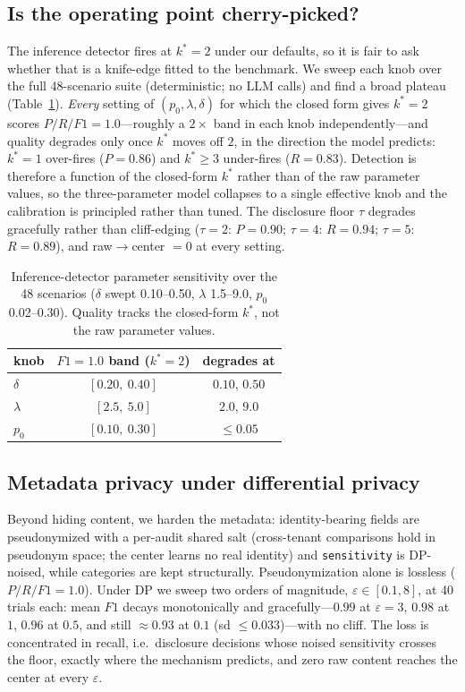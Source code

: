 \documentclass[sigconf,anonymous,review]{acmart}
\theoremstyle{acmplain}
\begin{document}
\subsection{Is the operating point cherry-picked?}
The inference detector fires at $k^{*}{=}2$ under our defaults, so it is fair to ask
whether that is a knife-edge fitted to the benchmark. We sweep each knob over the full
48-scenario suite (deterministic; no LLM calls) and find a broad plateau
(Table~\ref{tab:sens}). \emph{Every} setting of $(p_0,\lambda,\delta)$ for which the
closed form gives $k^{*}{=}2$ scores $P/R/F1=1.0$---roughly a $2\times$ band in each
knob independently---and quality degrades only once $k^{*}$ moves off $2$, in the
direction the model predicts: $k^{*}{=}1$ over-fires ($P{=}0.86$) and $k^{*}\ge3$
under-fires ($R{=}0.83$). Detection is therefore a function of the closed-form
$k^{*}$ rather than of the raw parameter values, so the three-parameter model
collapses to a single effective knob and the calibration is principled rather than
tuned. The disclosure floor $\tau$ degrades gracefully rather than cliff-edging
($\tau{=}2$: $P{=}0.90$; $\tau{=}4$: $R{=}0.94$; $\tau{=}5$: $R{=}0.89$), and
raw$\to$center $=0$ at every setting.

\begin{table}[t]\centering\small
\begin{tabular}{lcc}
\toprule
knob & $F1{=}1.0$ band ($k^{*}{=}2$) & degrades at \\
\midrule
$\delta$  & $[0.20,\ 0.40]$ & $0.10$, $0.50$ \\
$\lambda$ & $[2.5,\ 5.0]$   & $2.0$, $9.0$ \\
$p_0$     & $[0.10,\ 0.30]$ & $\le 0.05$ \\
\bottomrule
\end{tabular}
\caption{Inference-detector parameter sensitivity over the 48 scenarios
($\delta$ swept 0.10--0.50, $\lambda$ 1.5--9.0, $p_0$ 0.02--0.30). Quality tracks the
closed-form $k^{*}$, not the raw parameter values.}
\label{tab:sens}
\end{table}


\subsection{Metadata privacy under differential privacy}
Beyond hiding content, we harden the
metadata: identity-bearing fields are pseudonymized with a per-audit shared salt
(cross-tenant comparisons hold in pseudonym space; the center learns no real
identity) and \texttt{sensitivity} is DP-noised, while categories are kept
structurally. Pseudonymization alone is lossless ($P/R/F1=1.0$). Under DP we
sweep two orders of magnitude, $\varepsilon\in[0.1,8]$, at 40 trials each: mean
$F1$ decays monotonically and gracefully---$0.99$ at $\varepsilon{=}3$, $0.98$ at
$1$, $0.96$ at $0.5$, and still $\approx0.93$ at $0.1$ (sd $\le0.033$)---with no
cliff. The loss is concentrated in recall, i.e.\ disclosure decisions whose noised
sensitivity crosses the floor, exactly where the mechanism predicts, and zero raw
content reaches the center at every $\varepsilon$.
\end{document}
